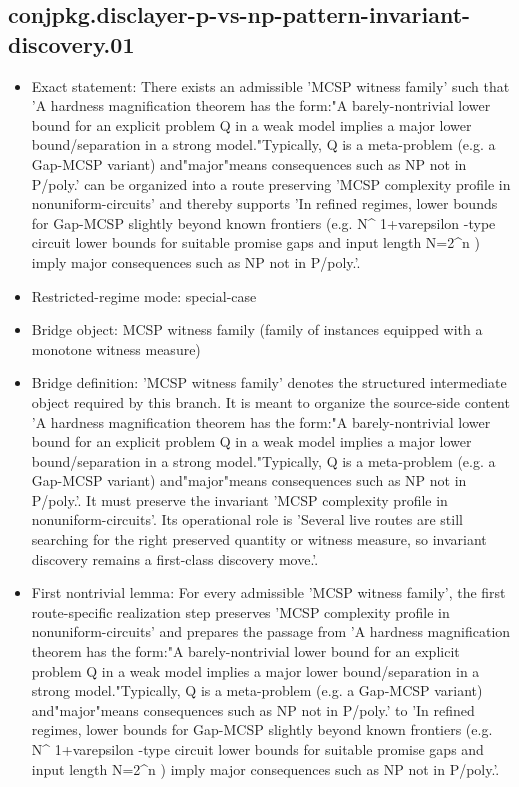 \documentclass[11pt]{article}
\begin{document}
\subsection*{conjpkg.disclayer-p-vs-np-pattern-invariant-discovery.01}
\begin{itemize}
\item Exact statement: There exists an admissible 'MCSP witness family' such that 'A hardness magnification theorem has the form:"A barely-nontrivial lower bound for an explicit problem Q in a weak model implies a major lower bound/separation in a strong model."Typically, Q is a meta-problem (e.g. a Gap-MCSP variant) and"major"means consequences such as NP not in P/poly.' can be organized into a route preserving 'MCSP complexity profile in nonuniform-circuits' and thereby supports 'In refined regimes, lower bounds for Gap-MCSP slightly beyond known frontiers (e.g. N\textasciicircum{} 1+varepsilon -type circuit lower bounds for suitable promise gaps and input length N=2\textasciicircum{}n ) imply major consequences such as NP not in P/poly.'.
\item Restricted-regime mode: special-case
\item Bridge object: MCSP witness family (family of instances equipped with a monotone witness measure)
\item Bridge definition: 'MCSP witness family' denotes the structured intermediate object required by this branch. It is meant to organize the source-side content 'A hardness magnification theorem has the form:"A barely-nontrivial lower bound for an explicit problem Q in a weak model implies a major lower bound/separation in a strong model."Typically, Q is a meta-problem (e.g. a Gap-MCSP variant) and"major"means consequences such as NP not in P/poly.'. It must preserve the invariant 'MCSP complexity profile in nonuniform-circuits'. Its operational role is 'Several live routes are still searching for the right preserved quantity or witness measure, so invariant discovery remains a first-class discovery move.'.
\item First nontrivial lemma: For every admissible 'MCSP witness family', the first route-specific realization step preserves 'MCSP complexity profile in nonuniform-circuits' and prepares the passage from 'A hardness magnification theorem has the form:"A barely-nontrivial lower bound for an explicit problem Q in a weak model implies a major lower bound/separation in a strong model."Typically, Q is a meta-problem (e.g. a Gap-MCSP variant) and"major"means consequences such as NP not in P/poly.' to 'In refined regimes, lower bounds for Gap-MCSP slightly beyond known frontiers (e.g. N\textasciicircum{} 1+varepsilon -type circuit lower bounds for suitable promise gaps and input length N=2\textasciicircum{}n ) imply major consequences such as NP not in P/poly.'.

\end{itemize}
\end{document}
